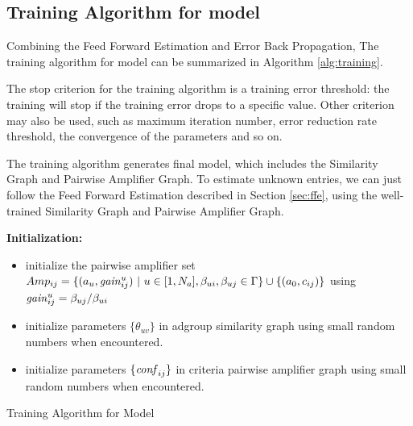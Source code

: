 \subsection{Training Algorithm for {\sppan} model}
Combining the Feed Forward Estimation and Error Back Propagation, The
training algorithm for {\sppan} model can be summarized in Algorithm
\ref{alg:training}.

The stop criterion for the training algorithm is a training error
threshold: the training will stop if the training error drops to a
specific value. Other criterion may also be used, such as maximum
iteration number\cite{?}, error reduction rate threshold\cite{?}, the
convergence of the parameters\cite{?} and so on.

The training algorithm generates final {\sppan} model, which includes
the Similarity Graph and Pairwise Amplifier Graph. To estimate unknown
entries, we can just follow the Feed Forward Estimation described in
Section \ref{sec:ffe}, using the well-trained Similarity Graph and
Pairwise Amplifier Graph.


\begin{algorithm}
  \textbf{Initialization:}\\
  \begin{itemize}
  \item initialize the pairwise amplifier set
    $Amp_{ij}=\{(a_u,\mathit{gain}^{u}_{ij})~|~u\in
    [1,N_a],\beta_{ui},\beta_{uj}\in \Gamma\} \cup \{(a_0,c_{ij})\}$
    using $\mathit{gain}^{u}_{ij}=\beta_{uj}/\beta_{ui}$
  \item initialize parameters $\{\theta_{uv}\}$ in adgroup similarity
    graph using small random numbers when encountered.
  \item initialize parameters $\{\mathit{conf}_{ij}\}$ in criteria pairwise
    amplifier graph using small random numbers when encountered.
  \end{itemize}
  \caption{Training Algorithm for {\sppan} Model}
  \label{alg:training}
\end{algorithm}

